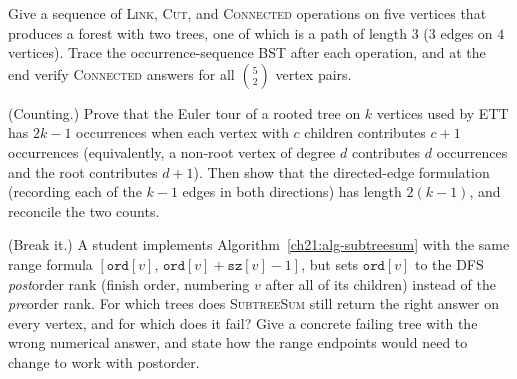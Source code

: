 \begin{exercise}
Give a sequence of \textsc{Link}, \textsc{Cut}, and \textsc{Connected} operations on five
vertices that produces a forest with two trees, one of which is a path of length $3$ ($3$ edges on $4$ vertices).
Trace the occurrence-sequence BST after each operation, and at the end verify
\textsc{Connected} answers for all $\binom{5}{2}$ vertex pairs.
\end{exercise}

\begin{exercise}
(Counting.) Prove that the Euler tour of a rooted tree on $k$ vertices used by ETT has
$2k-1$ occurrences when each vertex with $c$ children contributes $c+1$ occurrences (equivalently, a non-root vertex of degree $d$ contributes $d$ occurrences and the root contributes $d+1$). Then
show that the directed-edge formulation (recording each of the $k-1$ edges in both directions)
has length $2(k-1)$, and reconcile the two counts.
\end{exercise}

\begin{exercise}
(Break it.) A student implements Algorithm~\ref{ch21:alg-subtreesum} with the same range formula $[\texttt{ord}[v],\,\texttt{ord}[v]+\texttt{sz}[v]-1]$, but sets $\texttt{ord}[v]$ to the DFS
\emph{post}order rank (finish order, numbering $v$ after all of its children) instead of the \emph{pre}order rank. For which trees does
\textsc{SubtreeSum} still return the right answer on every vertex, and for which does it fail? Give a
concrete failing tree with the wrong numerical answer, and state how the range endpoints would need to change to work with postorder.
\end{exercise}
